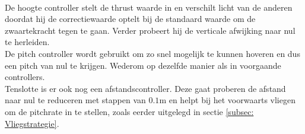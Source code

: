 \\
De hoogte controller stelt de thrust waarde in en verschilt licht van de anderen doordat hij de correctiewaarde optelt bij de standaard waarde om de zwaartekracht tegen te gaan. Verder probeert hij de verticale afwijking naar nul te herleiden.
\\
De pitch controller wordt gebruikt om zo snel mogelijk te kunnen hoveren en dus een pitch van nul te krijgen. Wederom op dezelfde manier als in voorgaande controllers.
\\
Tenslotte is er ook nog een afstandscontroller. Deze gaat proberen de afstand naar nul te reduceren met stappen van \(0.1\)m en helpt bij het voorwaarts vliegen om de pitchrate in te stellen, zoals eerder uitgelegd in sectie \ref{subsec: Vliegstrategie}.